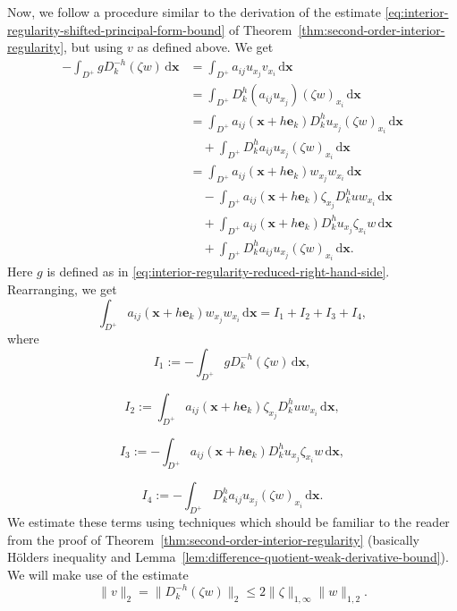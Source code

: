 \begin{Proof}
Now, we follow a procedure similar to the derivation of the estimate \eqref{eq:interior-regularity-shifted-principal-form-bound} of Theorem~\ref{thm:second-order-interior-regularity}, but using $v$ as defined above. We get\[\begin{aligned}
-\int_{D^+}gD_k^{-h}(\zeta w)\,\mathrm{d}\bm{x}
&=\int_{D^+}a_{ij}u_{x_j}v_{x_i}\,\mathrm{d}\bm{x}\\
&=\int_{D^+}D_k^h(a_{ij}u_{x_j})(\zeta w)_{x_i}\,\mathrm{d}\bm{x}\\
&=\int_{D^+}a_{ij}(\bm{x}+h\bm{e}_k)D_k^hu_{x_j}(\zeta w)_{x_i}\,\mathrm{d}\bm{x}\\
&\quad+\int_{D^+}D_k^ha_{ij}u_{x_j}(\zeta w)_{x_i}\,\mathrm{d}\bm{x}\\
&=\int_{D^+}a_{ij}(\bm{x}+h\bm{e}_k)w_{x_j}w_{x_i}\,\mathrm{d}\bm{x}\\
&\quad-\int_{D^+}a_{ij}(\bm{x}+h\bm{e}_k)\zeta_{x_j}D_k^huw_{x_i}\,\mathrm{d}\bm{x}\\
&\quad+\int_{D^+}a_{ij}(\bm{x}+h\bm{e}_k)D_k^hu_{x_j}\zeta_{x_i}w\,\mathrm{d}\bm{x}\\
&\quad+\int_{D^+}D_k^ha_{ij}u_{x_j}(\zeta w)_{x_i}\,\mathrm{d}\bm{x}.
\end{aligned}\]Here $g$ is defined as in \eqref{eq:interior-regularity-reduced-right-hand-side}. Rearranging, we get
\begin{equation}\label{eq:flat-boundary-principal-energy-four-term-decomposition}
\int_{D^+}a_{ij}(\bm{x}+h\bm{e}_k)w_{x_j}w_{x_i}\,\mathrm{d}\bm{x}=I_1+I_2+I_3+I_4,
\end{equation}
where
\begin{equation}\label{eq:flat-boundary-energy-term-one}
I_1:=-\int_{D^+}gD_k^{-h}(\zeta w)\,\mathrm{d}\bm{x},
\end{equation}

\begin{equation}\label{eq:flat-boundary-energy-term-two}
I_2:=\int_{D^+}a_{ij}(\bm{x}+h\bm{e}_k)\zeta_{x_j}D_k^huw_{x_i}\,\mathrm{d}\bm{x},
\end{equation}

\begin{equation}\label{eq:flat-boundary-energy-term-three}
I_3:=-\int_{D^+}a_{ij}(\bm{x}+h\bm{e}_k)D_k^hu_{x_j}\zeta_{x_i}w\,\mathrm{d}\bm{x},
\end{equation}

\begin{equation}\label{eq:flat-boundary-energy-term-four}
I_4:=-\int_{D^+}D_k^ha_{ij}u_{x_j}(\zeta w)_{x_i}\,\mathrm{d}\bm{x}.
\end{equation}
We estimate these terms using techniques which should be familiar to the reader from the proof of Theorem~\ref{thm:second-order-interior-regularity} (basically Hölder\textquotesingle s inequality and Lemma~\ref{lem:difference-quotient-weak-derivative-bound}). We will make use of the estimate
\begin{equation}\label{eq:flat-boundary-test-function-l2-bound}
\|v\|_2=\|D_k^{-h}(\zeta w)\|_2\leq2\|\zeta\|_{1,\infty}\|w\|_{1,2}.
\end{equation}

\end{Proof}
\endgroup
